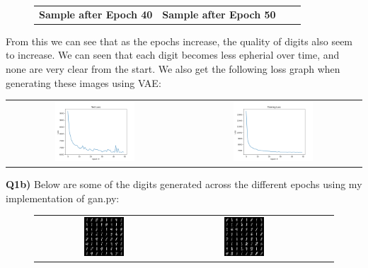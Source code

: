 \documentclass{article}
\begin{document}
\begin{titlepage}
\begin{figure} [H]
\begin{tabular}{cccc}
\textbf{ Sample after Epoch 40 }  & \textbf{ Sample after Epoch 50 } 
\end{tabular}
\end{figure}
From this we can see that as the epochs increase, the quality of digits also seem to increase. We can seen that each digit becomes less epherial over time, and none are very clear from the start. We also get the following loss graph when generating these images using VAE:
\begin{center}
\begin{tabular}{cc}
\includegraphics[width=0.47\textwidth]{VANtest.png} & \includegraphics[width=0.47\textwidth]{VANtrain.png}
\end{tabular}
\end{center}
\newpage
\textbf{Q1b)} Below are some of the digits generated across the different epochs using my implementation of gan.py:
\begin{figure} [H]
\centering
\begin{tabular}{cccc}
\includegraphics[width=0.3\textwidth]{sample_10_GAN.png} &
\includegraphics[width=0.3\textwidth]{sample_20_GAN.png} &

\end{tabular}
\end{figure}
\end{titlepage}
\end{document}
